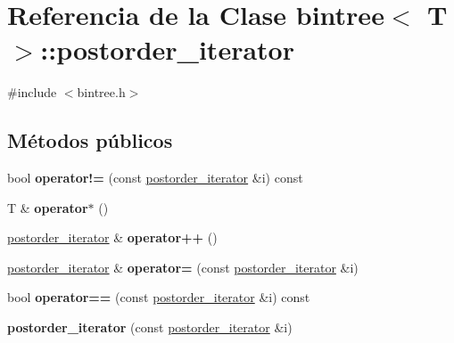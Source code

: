 \hypertarget{classbintree_1_1postorder__iterator}{}\section{Referencia de la Clase bintree$<$ T $>$\+:\+:postorder\+\_\+iterator}
\label{classbintree_1_1postorder__iterator}


{\ttfamily \#include $<$bintree.\+h$>$}

\subsection*{Métodos públicos}
\begin{DoxyCompactItemize}
\item 
\hypertarget{classbintree_1_1postorder__iterator_adbec84d4a2528ef1143f6516a42b9aea}{}bool {\bfseries operator!=} (const \hyperlink{classbintree_1_1postorder__iterator}{postorder\+\_\+iterator} \&i) const \label{classbintree_1_1postorder__iterator_adbec84d4a2528ef1143f6516a42b9aea}

\item 
\hypertarget{classbintree_1_1postorder__iterator_a17c712da51aa46720e2b9da87e0a33ac}{}T \& {\bfseries operator$\ast$} ()\label{classbintree_1_1postorder__iterator_a17c712da51aa46720e2b9da87e0a33ac}

\item 
\hypertarget{classbintree_1_1postorder__iterator_a12d7ff6822212e84ac3cdd85f0e7766d}{}\hyperlink{classbintree_1_1postorder__iterator}{postorder\+\_\+iterator} \& {\bfseries operator++} ()\label{classbintree_1_1postorder__iterator_a12d7ff6822212e84ac3cdd85f0e7766d}

\item 
\hypertarget{classbintree_1_1postorder__iterator_ad8c883f6d5aafb02675e571c4758cf46}{}\hyperlink{classbintree_1_1postorder__iterator}{postorder\+\_\+iterator} \& {\bfseries operator=} (const \hyperlink{classbintree_1_1postorder__iterator}{postorder\+\_\+iterator} \&i)\label{classbintree_1_1postorder__iterator_ad8c883f6d5aafb02675e571c4758cf46}

\item 
\hypertarget{classbintree_1_1postorder__iterator_a665cd867a17ca543f66b90a9a24f4a04}{}bool {\bfseries operator==} (const \hyperlink{classbintree_1_1postorder__iterator}{postorder\+\_\+iterator} \&i) const \label{classbintree_1_1postorder__iterator_a665cd867a17ca543f66b90a9a24f4a04}

\item 
\hypertarget{classbintree_1_1postorder__iterator_ab833e690df460ec874702031b7ddb8fd}{}{\bfseries postorder\+\_\+iterator} (const \hyperlink{classbintree_1_1postorder__iterator}{postorder\+\_\+iterator} \&i)\label{classbintree_1_1postorder__iterator_ab833e690df460ec874702031b7ddb8fd}

\end{DoxyCompactItemize}
